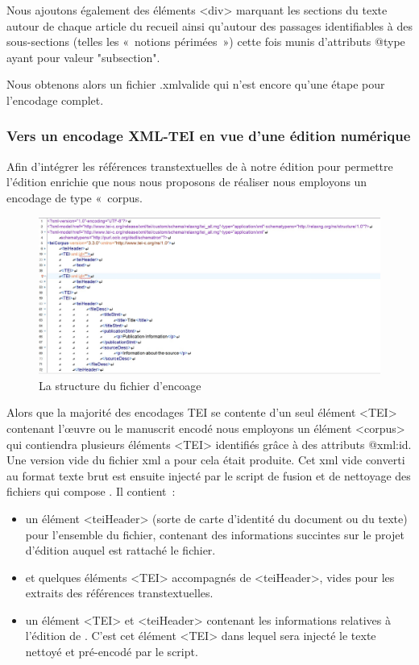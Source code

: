 \documentclass[12pt, a4paper]{article}
\begin{document}
Nous ajoutons également des éléments <div> marquant les sections du texte autour de chaque article du recueil ainsi qu'autour des passages identifiables à des sous-sections (telles les «~notions périmées~») cette fois munis d'attributs @type ayant pour valeur "subsection".

Nous obtenons alors un fichier \go.xml\gf valide qui n'est encore qu'une étape pour l'encodage complet.

\subsubsection{Vers un encodage XML-TEI en vue d'une édition numérique}
\label{tei}

Afin d'intégrer les références transtextuelles de \punr{} à notre édition pour permettre l'édition enrichie que nous nous proposons de réaliser nous employons un encodage de type «~corpus\gf. 
\begin{figure}[H]
    \centering
    \includegraphics[scale=0.3]{img/screen_itei_corpus.jpg}
    \caption{La structure du fichier d'encoage}
    \label{fig:screen_tei_corpus}
\end{figure}
Alors que la majorité des encodages TEI se contente d'un seul élément <TEI> contenant l'œuvre ou le manuscrit encodé nous employons un élément <corpus> qui contiendra plusieurs éléments <TEI> identifiés grâce à des attributs @xml\NoAutoSpaceBeforeFDP:id. Une version vide du fichier xml a pour cela était produite. Cet xml vide converti au format texte brut est ensuite injecté par le script de fusion et de nettoyage des fichiers qui compose \punr. Il contient~:
\begin{itemize}
    \item un élément <teiHeader> (sorte de carte d'identité du document ou du texte) pour l'ensemble du fichier, contenant des informations succintes sur le projet d'édition auquel est rattaché le fichier.
    \item et quelques éléments <TEI> accompagnés de <teiHeader>, vides pour les extraits des références transtextuelles.
    \item un élément <TEI> et <teiHeader> contenant les informations relatives à l'édition de \punr. C'est cet élément <TEI> dans lequel sera injecté le texte nettoyé et pré-encodé par le script.
\end{itemize}
\end{document}
